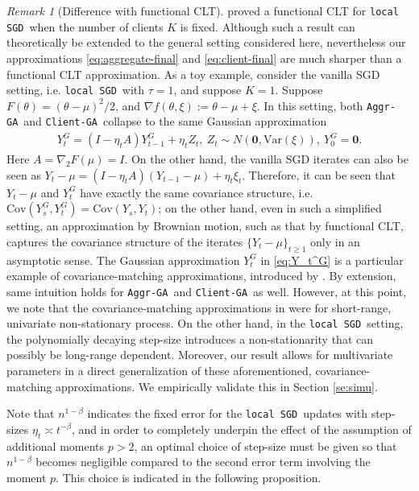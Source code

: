 \documentclass[a4paper,11pt]{article}
\numberwithin{equation}{section}
\theoremstyle{plain}
\theoremstyle{remark}
\newtheorem{remark}{Remark}[section]
\def\eo{\mathbf{0}}
\newcommand{\DFL}{\texttt{local SGD}}
\newcommand{\ag}{\texttt{Aggr-GA}}
\newcommand{\cg}{\texttt{Client-GA}}
\newcommand{\cov}{\mathrm{Cov}}
\newcommand{\var}{\mathrm{Var}}
\begin{document}
\begin{remark}[Difference with functional CLT]
\cite{li2022statistical} proved a functional CLT for \DFL\ when the number of clients $K$ is fixed. Although such a result can theoretically be extended to the general setting considered here, nevertheless our approximations \eqref{eq:aggregate-final} and \eqref{eq:client-final} are much sharper than a functional CLT approximation. As a toy example, consider the vanilla SGD setting, i.e. \DFL\ with $\tau=1$, and suppose $K=1$. Suppose $F(\theta)=(\theta-\mu)^2/2$, and $\nabla f(\theta, \xi):= \theta - \mu+\xi$. In this setting, both \ag\ and \cg\ collapse to the same Gaussian approximation 
\begin{align}\label{eq:Y_t^G}
    Y_t^G= (I-\eta_tA)Y_{t-1}^G + \eta_t Z_t, \ Z_t \sim N(\mathbf{0}, \var(\xi)), \ Y_0^G=\eo.
\end{align}
Here $A=\nabla_2F(\mu)=I$. On the other hand, the vanilla SGD iterates can also be seen as
 $ Y_t -\mu= (I-\eta_tA)(Y_{t-1} -\mu) + \eta_t \xi_t.$ 
Therefore, it can be seen that $Y_t - \mu$ and $Y_t^G$ have exactly the same covariance structure, i.e. $\cov(Y_s^G, Y_t^G)=\cov(Y_s, Y_t)$; on the other hand, even in such a simplified setting, an approximation by Brownian motion, such as that by functional CLT, captures the covariance structure of the iterates $\{Y_t- \mu\}_{t\geq 1}$ only in an asymptotic sense. The Gaussian approximation $Y_t^G$ in \eqref{eq:Y_t^G} is a particular example of covariance-matching approximations, introduced by \cite{bonnerjee2024aos}. By extension, same intuition holds for \ag\ and \cg\ as well. However, at this point, we note that the covariance-matching approximations in \cite{bonnerjee2024aos} were for short-range, univariate non-stationary process. On the other hand, in the \DFL\ setting, the polynomially decaying step-size introduces a non-stationarity that can possibly be long-range dependent. Moreover, our result allows for multivariate parameters in a direct generalization of these aforementioned, covariance-matching approximations. We empirically validate this in Section \ref{se:simu}.
\end{remark}
    Note that $n^{1-\beta}$ indicates the fixed error for the \DFL\ updates with step-sizes $\eta_t \asymp t^{-\beta}$, and in order to completely underpin the effect of the assumption of additional moments $p>2$, an optimal choice of step-size must be given so that $n^{1-\beta}$ becomes negligible compared to the second error term involving the moment $p$. This choice is indicated in the following proposition. 
\end{document}
